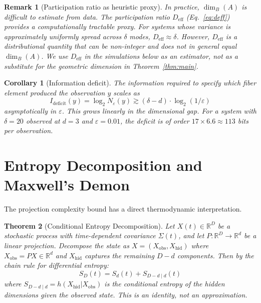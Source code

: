 \documentclass[12pt,a4paper]{article}
\newtheorem{theorem}{Theorem}
\newtheorem{corollary}[theorem]{Corollary}
\newtheorem{remark}{Remark}
\begin{document}
\begin{remark}[Participation ratio as heuristic proxy]
\label{rem:deff}
In practice, $\dim_B(A)$ is difficult to estimate from data.
The participation ratio $D_{\mathrm{eff}}$ (Eq.~\ref{eq:deff}) provides a computationally tractable proxy.
For systems whose variance is approximately uniformly spread across $\delta$ modes, $D_{\mathrm{eff}} \approx \delta$.
However, $D_{\mathrm{eff}}$ is a distributional quantity that can be non-integer and does not in general equal $\dim_B(A)$.
We use $D_{\mathrm{eff}}$ in the simulations below as an estimator, not as a substitute for the geometric dimension in Theorem~\ref{thm:main}.
\end{remark}

\begin{corollary}[Information deficit]
\label{cor:info}
The information required to specify which fiber element produced the observation $y$ scales as
\begin{equation}
I_{\mathrm{deficit}}(y) = \log_2 N_\varepsilon(y) \gtrsim (\delta - d) \cdot \log_2(1/\varepsilon)
\label{eq:info_deficit}
\end{equation}
asymptotically in $\varepsilon$.
This grows linearly in the dimensional gap.
For a system with $\delta = 20$ observed at $d = 3$ and $\varepsilon = 0.01$, the deficit is of order $17 \times 6.6 \approx 113$ bits per observation.
\end{corollary}


\section{Entropy Decomposition and Maxwell's Demon}
\label{sec:entropy}

The projection complexity bound has a direct thermodynamic interpretation.

\begin{theorem}[Conditional Entropy Decomposition]
\label{thm:entropy}
Let $X(t) \in \mathbb{R}^D$ be a stochastic process with time-dependent covariance $\Sigma(t)$, and let $P: \mathbb{R}^D \to \mathbb{R}^d$ be a linear projection.
Decompose the state as $X = (X_{\mathrm{obs}}, X_{\mathrm{hid}})$ where $X_{\mathrm{obs}} = PX \in \mathbb{R}^d$ and $X_{\mathrm{hid}}$ captures the remaining $D - d$ components.
Then by the chain rule for differential entropy:
\begin{equation}
S_D(t) = S_d(t) + S_{D-d \mid d}(t)
\label{eq:entropy_decomp}
\end{equation}
where $S_{D-d \mid d} = h(X_{\mathrm{hid}} | X_{\mathrm{obs}})$ is the conditional entropy of the hidden dimensions given the observed state.
This is an identity, not an approximation.
\end{theorem}
\end{document}
